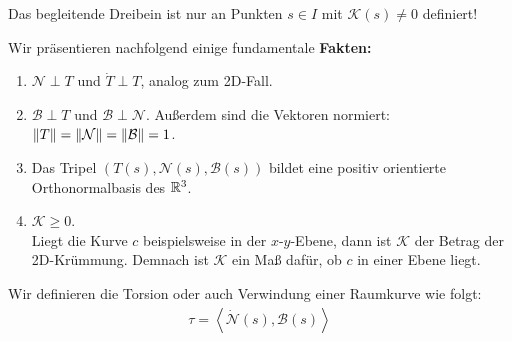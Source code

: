 \begin{bem}
	Das begleitende Dreibein ist nur an Punkten $s \in I$ mit $\mathcal{K}(s) \neq 0$ definiert!
\end{bem}
Wir präsentieren nachfolgend einige fundamentale \textbf{Fakten:}
\begin{enumerate}
	\item $\mathcal{N} \perp T$ und $\dot{T} \perp T$, analog zum 2D-Fall.
	\item $\mathcal{B} \perp T$ und $\mathcal{B}\perp\mathcal{N}$. Außerdem sind die Vektoren normiert: $\norm{T} = \norm{\mathcal{N}} = \norm{\mathcal{B}} = 1$. 
	\item Das Tripel $\left(T(s),\mathcal{N}(s),\mathcal{B}(s)\right)$ bildet eine positiv orientierte Orthonormalbasis des $\mathbb{R}^3$.
	\item $\mathcal{K} \geq 0$.\\
		 Liegt die Kurve $c$ beispielsweise in der $x$-$y$-Ebene, dann ist $\mathcal{K}$ der Betrag der 2D-Krümmung. Demnach ist $\mathcal{K}$ ein Maß dafür, ob $c$ in einer Ebene liegt.
\end{enumerate}
\begin{defs}
	Wir definieren die Torsion oder auch Verwindung einer Raumkurve wie folgt: 
	\begin{align}
		\tau = \left<\dot{\mathcal{N}}(s),\mathcal{B}(s)\right> 
	\end{align}
\end{defs}

